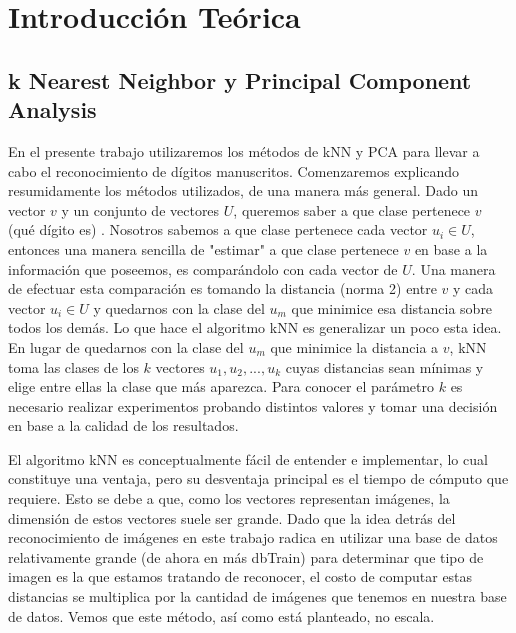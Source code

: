 \section{Introducción Teórica}
%
\subsection{k Nearest Neighbor y Principal Component Analysis}
En el presente trabajo utilizaremos los métodos de kNN y PCA para llevar a cabo el reconocimiento de dígitos manuscritos. Comenzaremos explicando resumidamente los métodos utilizados, de una manera más general. Dado un vector $v$ y un conjunto de vectores $U$, queremos saber a que clase pertenece $v$ (qué dígito es) . Nosotros sabemos a que clase pertenece cada vector $u_i \in U$, entonces una manera sencilla de "estimar" a que clase pertenece $v$ en base a la información que poseemos, es comparándolo con cada vector de $U$. Una manera de efectuar esta comparación es tomando la distancia (norma 2) entre $v$ y cada vector $u_i \in U$ y quedarnos con la clase del $u_m$ que minimice esa distancia sobre todos los demás. Lo que hace el algoritmo kNN es generalizar un poco esta idea. En lugar de quedarnos con la clase del $u_m$ que minimice la distancia a $v$, kNN toma las clases de los $k$ vectores $u_1, u_2, ..., u_k$ cuyas distancias sean mínimas y elige entre ellas la clase que más aparezca. Para conocer el parámetro $k$ es necesario realizar experimentos probando distintos valores y tomar una decisión en base a la calidad de los resultados.
\par El algoritmo kNN es conceptualmente fácil de entender e implementar, lo cual constituye una ventaja, pero su desventaja principal es el tiempo de cómputo que requiere. Esto se debe a que, como los vectores representan imágenes, la dimensión de estos vectores suele ser grande. Dado que la idea detrás del reconocimiento de imágenes en este trabajo radica en utilizar una base de datos relativamente grande (de ahora en más dbTrain) para determinar que tipo de imagen es la que estamos tratando de reconocer, el costo de computar estas distancias se multiplica por la cantidad de imágenes que tenemos en nuestra base de datos. Vemos que este método, así como está planteado, no escala.
